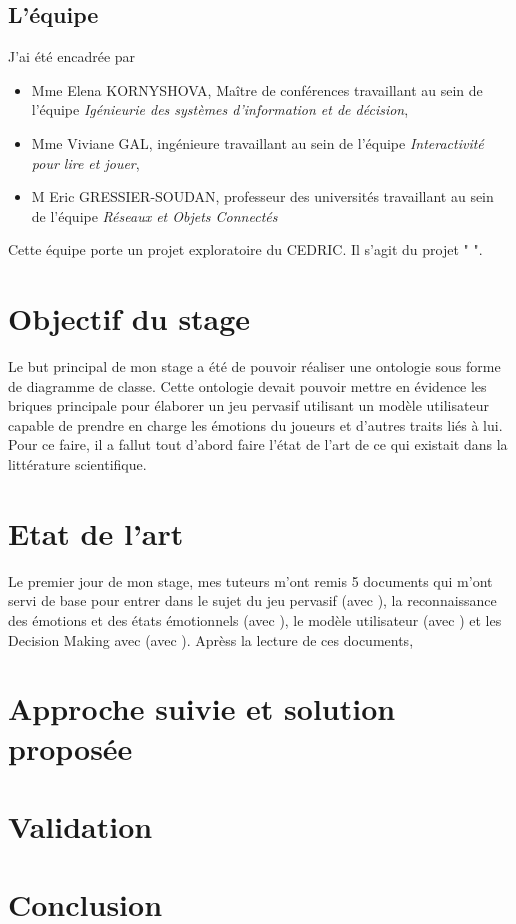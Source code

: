 \documentclass{article}
\begin{document}
	\subsection{L'équipe}
		J'ai été encadrée par 
		\begin{itemize}
			\item Mme Elena KORNYSHOVA, Maître de conférences travaillant au sein de l'équipe \textit{Igénieurie des systèmes d'information et de décision}, 
			\item Mme Viviane GAL, ingénieure travaillant au sein de l'équipe \textit{Interactivité pour lire et jouer},
			\item M Eric GRESSIER-SOUDAN, professeur des universités travaillant au sein de l'équipe \textit{Réseaux et Objets Connectés}
		\end{itemize}
		Cette équipe porte un projet exploratoire du CEDRIC. Il s'agit du projet "	".

\section{Objectif du stage}
	Le but principal de mon stage a été de pouvoir réaliser une ontologie sous forme de diagramme de classe. 
	Cette ontologie devait pouvoir mettre en évidence les briques principale pour élaborer un jeu pervasif utilisant un modèle utilisateur capable de prendre en charge les émotions du joueurs et d'autres traits liés à lui.\newline
	Pour ce faire, il a fallut tout d'abord faire l'état de l'art de ce qui existait dans la littérature scientifique.

\section{Etat de l'art}
	Le premier jour de mon stage, mes tuteurs m'ont remis 5 documents qui m'ont servi de base pour entrer dans le sujet du jeu pervasif (avec \cite{gal_2019}), la reconnaissance des émotions et des états émotionnels (avec \cite{gal_2019,gizycka_et_al._2018,nalepa_et_al._2019}), le modèle utilisateur (avec \cite{alhudar_2019}) et les Decision Making avec (avec \cite{kornyshova_et_al._2010}).\newline
	Aprèss la lecture de ces documents, 
\section{Approche suivie et solution proposée}
\section{Validation}
\section{Conclusion}




\end{document}
